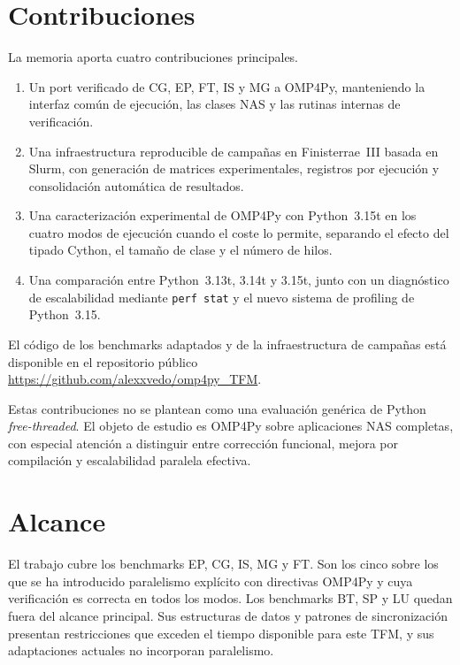 \section{Contribuciones}
\label{sec:contribuciones}

La memoria aporta cuatro contribuciones principales.

\begin{enumerate}
  \item Un port verificado de CG, EP, FT, IS y MG a OMP4Py, manteniendo la
        interfaz común de ejecución, las clases NAS y las rutinas internas de
        verificación.
  \item Una infraestructura reproducible de campañas en Finisterrae~III basada
        en Slurm, con generación de matrices experimentales, registros por
        ejecución y consolidación automática de resultados.
  \item Una caracterización experimental de OMP4Py con Python~3.15t en los
        cuatro modos de ejecución cuando el coste lo permite, separando el efecto
        del tipado Cython, el tamaño de clase y el número de hilos.
  \item Una comparación entre Python~3.13t, 3.14t y 3.15t, junto con un
        diagnóstico de escalabilidad mediante \texttt{perf stat} y el nuevo
        sistema de profiling de Python~3.15.
\end{enumerate}

El código de los benchmarks adaptados y de la infraestructura de campañas está
disponible en el repositorio público
\url{https://github.com/alexxvedo/omp4py_TFM}.

Estas contribuciones no se plantean como una evaluación genérica de Python
\emph{free-threaded}. El objeto de estudio es OMP4Py sobre aplicaciones NAS
completas, con especial atención a distinguir entre corrección funcional, mejora
por compilación y escalabilidad paralela efectiva.


\section{Alcance}
\label{sec:alcance}

El trabajo cubre los benchmarks EP, CG, IS, MG y FT. Son los cinco sobre los que
se ha introducido paralelismo explícito con directivas OMP4Py y cuya verificación
es correcta en todos los modos. Los benchmarks BT, SP y LU quedan fuera del
alcance principal. Sus estructuras de datos y patrones de sincronización
presentan restricciones que exceden el tiempo disponible para este TFM, y sus
adaptaciones actuales no incorporan paralelismo.


